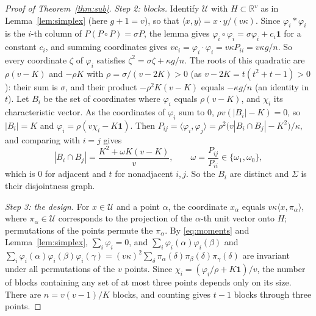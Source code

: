 \documentclass[11pt]{article}
\theoremstyle{definition}
\theoremstyle{remark}
\newcommand{\ip}[2]{\langle #1,#2\rangle}
\begin{document}
\begin{proof}[Proof of Theorem~\ref{thm:sub}]
\emph{Step 2: blocks.} Identify $\mathcal U$ with $H\subset\mathbb R^v$ as in
Lemma~\ref{lem:simplex} (here $g+1=v$), so that $\ip xy=x\cdot y/(v\kappa)$.
Since $\varphi_i*\varphi_i$ is the $i$-th column of $P(P\circ P)=\sigma P$,
the lemma gives $\varphi_i\circ\varphi_i=\sigma\varphi_i+c_i\mathbf 1$ for a
constant $c_i$, and summing coordinates gives
$vc_i=\varphi_i\cdot\varphi_i=v\kappa P_{ii}=v\kappa g/n$. So every
coordinate $\zeta$ of $\varphi_i$ satisfies $\zeta^2=\sigma\zeta+\kappa g/n$.
The roots of this quadratic are $\rho(v-K)$ and $-\rho K$ with
$\rho=\sigma/(v-2K)>0$ (as $v-2K=t(t^2+t-1)>0$): their sum is $\sigma$, and their product
$-\rho^2K(v-K)$ equals $-\kappa g/n$ (an identity in $t$). Let $B_i$ be the
set of coordinates where $\varphi_i$ equals $\rho(v-K)$, and $\chi_i$ its
characteristic vector. As the coordinates of $\varphi_i$ sum to $0$,
$\rho v(|B_i|-K)=0$, so $|B_i|=K$ and $\varphi_i=\rho(v\chi_i-K\mathbf 1)$.
Then $P_{ij}=\ip{\varphi_i}{\varphi_j}=\rho^2\bigl(v|B_i\cap B_j|-K^2\bigr)/\kappa$,
and comparing with $i=j$ gives
\[
 |B_i\cap B_j|=\frac{K^2+\omega K(v-K)}v,\qquad \omega=\frac{P_{ij}}{P_{ii}}
 \in\{\omega_1,\omega_0\},
\]
which is $0$ for adjacent and $t$ for nonadjacent $i,j$. So the $B_i$ are
distinct and $\Sigma$ is their disjointness graph.

\emph{Step 3: the design.} For $x\in\mathcal U$ and a point $\alpha$, the
coordinate $x_\alpha$ equals $v\kappa\ip x{\pi_\alpha}$, where
$\pi_\alpha\in\mathcal U$ corresponds to the projection of the $\alpha$-th unit
vector onto $H$; permutations of the points permute the $\pi_\alpha$. By
\eqref{eq:moments} and Lemma~\ref{lem:simplex}, $\sum_i\varphi_i=0$, and
$\sum_i\varphi_i(\alpha)\varphi_i(\beta)$ and
$\sum_i\varphi_i(\alpha)\varphi_i(\beta)\varphi_i(\gamma)
=(v\kappa)^2\sum_\delta\pi_\alpha(\delta)\pi_\beta(\delta)\pi_\gamma(\delta)$
are invariant under all permutations of the $v$ points. Since
$\chi_i=(\varphi_i/\rho+K\mathbf 1)/v$, the number of blocks containing any
set of at most three points depends only on its size. There are
$n=v(v-1)/K$ blocks, and counting gives $t-1$ blocks through three points.
\end{proof}
\end{document}
